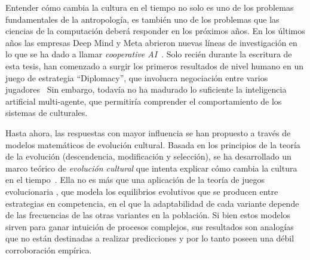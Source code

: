 \documentclass[a4paper,11pt]{book}
\theoremstyle{definition}
\begin{document}
Entender cómo cambia la cultura en el tiempo no solo es uno de los problemas fundamentales de la antropología, es también uno de los problemas que las ciencias de la computación deberá responder en los próximos años.
%
En los últimos años las empresas Deep Mind y Meta abrieron nuevas líneas de investigación en lo que se ha dado a llamar \emph{cooperative AI}~\cite{dafoe2020-coopAI, dafoe2021-coopAIcomment}.
%
Solo recién durante la escritura de esta tesis, han comenzado a surgir los primeros resultados de nivel humano en un juego de estrategia ``Diplomacy'', que involucra negociación entre varios jugadores~\cite{kramar2022-deepMindDiplomacy, meta2022-diplomacy}
%
Sin embargo, todavía no ha madurado lo suficiente la inteligencia artificial multi-agente, que permitiría comprender el comportamiento de los sistemas de culturales.


Hasta ahora, las respuestas con mayor influencia se han propuesto a través de modelos matemáticos de evolución cultural.
%
Basada en los principios de la teor\'ia de la evoluci\'on (descendencia, modificaci\'on y selecci\'on), se ha desarrollado un marco te\'orico de \emph{evoluci\'on cultural} que intenta explicar c\'omo cambia la cultura en el tiempo~\cite{boyd1985-evolutionaryProcess, boyd2005-origin}.
%
Ella no es más que una aplicación de la teoría de juegos evolucionaria \cite{taylor1978-replicatorDynamic, maynardSmith1982-evolutionGameTheory}, que modela los equilibrios evolutivos que se producen entre estrategias en competencia, en el que la adaptabilidad de cada variante depende de las frecuencias de las otras variantes en la población.
%
%
%
Si bien estos modelos sirven para ganar intuición de procesos complejos, sus resultados son analogías que no están destinadas a realizar predicciones y por lo tanto poseen una débil corroboración empírica.

\end{document}

